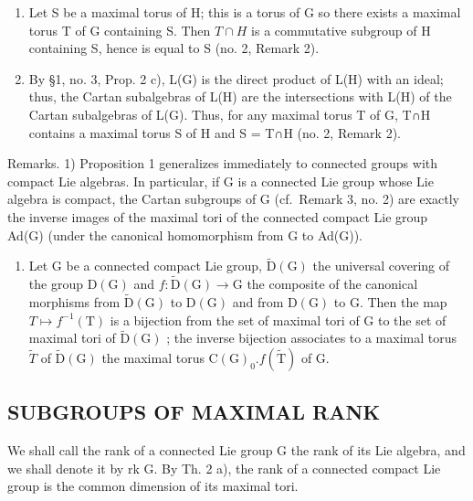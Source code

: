\begin{enumerate}
\def\labelenumi{\alph{enumi})}
\setcounter{enumi}{1}
\item
  Let S be a maximal torus of H; this is a torus of G so there exists a maximal torus T of G containing S. Then \(T \cap H\) is a commutative subgroup of H containing S, hence is equal to S (no. 2, Remark 2).
\item
  By §1, no. 3, Prop. 2 c), L(G) is the direct product of L(H) with an ideal; thus, the Cartan subalgebras of L(H) are the intersections with L(H) of the Cartan subalgebras of L(G). Thus, for any maximal torus T of G, T∩H contains a maximal torus S of H and S = T∩H (no. 2, Remark 2).
\end{enumerate}

Remarks. 1) Proposition 1 generalizes immediately to connected groups with compact Lie algebras. In particular, if G is a connected Lie group whose Lie algebra is compact, the Cartan subgroups of G (cf.~Remark 3, no. 2) are exactly the inverse images of the maximal tori of the connected compact Lie group Ad(G) (under the canonical homomorphism from G to Ad(G)).

\begin{enumerate}
\def\labelenumi{\arabic{enumi})}
\setcounter{enumi}{1}
\tightlist
\item
  Let G be a connected compact Lie group, \(\widetilde{\mathrm{D}}(\mathrm{G})\) the universal covering of the group \(\mathrm{D}(\mathrm{G})\) and \(f : \widetilde{\mathrm{D}}(\mathrm{G}) \to \mathrm{G}\) the composite of the canonical morphisms from \(\tilde{\mathrm{D}}(\mathrm{G})\) to \(\mathrm{D}(\mathrm{G})\) and from \(\mathrm{D}(\mathrm{G})\) to G. Then the map \(T \mapsto f^{-1}(\mathrm{T})\) is a bijection from the set of maximal tori of G to the set of maximal tori of \(\tilde{\mathrm{D}}(\mathrm{G})\) ; the inverse bijection associates to a maximal torus \(\tilde{T}\) of \(\tilde{\mathrm{D}}(\mathrm{G})\) the maximal torus \(\mathrm{C}(\mathrm{G})_{0}.f(\tilde{\mathrm{T}})\) of G.
\end{enumerate}

\subsection{SUBGROUPS OF MAXIMAL RANK}

We shall call the rank of a connected Lie group G the rank of its Lie algebra, and we shall denote it by rk G. By Th. 2 a), the rank of a connected compact Lie group is the common dimension of its maximal tori.

